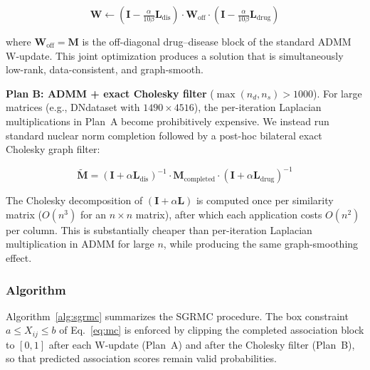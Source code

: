 \documentclass[webpdf,modern,large]{oup-authoring-template}
\begin{document}
\begin{equation}
\mathbf{W} \gets (\mathbf{I} - \tfrac{\alpha}{10\beta}\mathbf{L}_{\text{dis}}) \cdot \mathbf{W}_{\text{off}} \cdot (\mathbf{I} - \tfrac{\alpha}{10\beta}\mathbf{L}_{\text{drug}})
\label{eq:w_update}
\end{equation}

where $\mathbf{W}_{\text{off}} = \mathbf{M}$ is the off-diagonal drug--disease block of the standard ADMM W-update. This joint optimization produces a solution that is simultaneously low-rank, data-consistent, and graph-smooth.

\noindent\textbf{Plan B: ADMM + exact Cholesky filter} ($\max(n_d, n_s) > 1000$).\enspace
For large matrices (e.g., DNdataset with $1490 \times 4516$), the per-iteration Laplacian multiplications in Plan~A become prohibitively expensive. We instead run standard nuclear norm completion followed by a post-hoc bilateral exact Cholesky graph filter:

\begin{equation}
\tilde{\mathbf{M}} = (\mathbf{I} + \alpha \mathbf{L}_{\text{dis}})^{-1} \cdot \mathbf{M}_{\text{completed}} \cdot (\mathbf{I} + \alpha \mathbf{L}_{\text{drug}})^{-1}
\label{eq:cholesky}
\end{equation}

The Cholesky decomposition of $(\mathbf{I} + \alpha\mathbf{L})$ is computed once per similarity matrix ($O(n^3)$ for an $n \times n$ matrix), after which each application costs $O(n^2)$ per column. This is substantially cheaper than per-iteration Laplacian multiplication in ADMM for large $n$, while producing the same graph-smoothing effect.

\subsubsection{Algorithm}

Algorithm~\ref{alg:sgrmc} summarizes the SGRMC procedure. The box constraint $a \le X_{ij} \le b$ of Eq.~\eqref{eq:mc} is enforced by clipping the completed association block to $[0,1]$ after each W-update (Plan~A) and after the Cholesky filter (Plan~B), so that predicted association scores remain valid probabilities.
\end{document}
